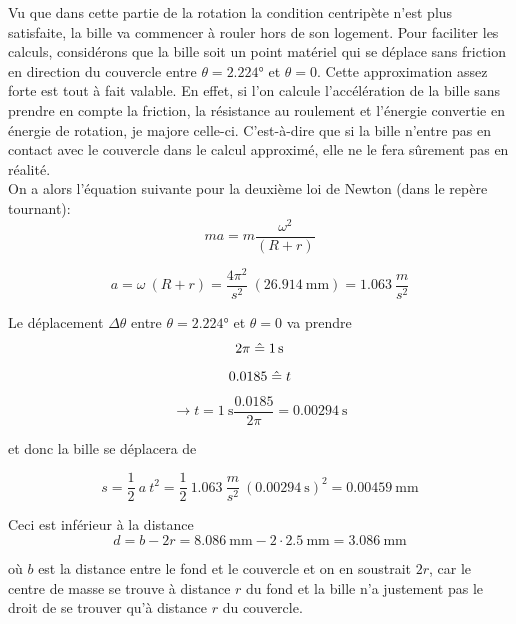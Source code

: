 Vu que dans cette partie de la rotation la condition centripète n'est plus satisfaite, la bille va commencer à rouler hors de son logement. Pour faciliter les calculs, considérons que la bille soit un point matériel qui se déplace sans friction en direction du couvercle entre $\theta = \ang{2.224}$ et $\theta = 0$. 
Cette approximation assez forte est tout à fait valable. En effet, si l'on calcule l'accélération de la bille sans prendre en compte la friction, la résistance au roulement et l'énergie convertie en énergie de rotation, je majore celle-ci. C'est-à-dire que si la bille n'entre pas en contact avec le couvercle dans le calcul approximé, elle ne le fera sûrement pas en réalité.\\

On a alors l'équation suivante pour la deuxième loi de Newton (dans le repère tournant):
\[ma = m \frac{\omega^{2}}{(R + r)}\]

\[a = \omega \ (R + r) = \frac{4 \pi^{2}}{s^{2}} \ (\SI{26.914}{\milli\metre}) = 1.063 \ \frac{m}{s^{2}}\]

Le déplacement $\Delta\theta$ entre $\theta =\ang{2.224}$ et $\theta = 0$ va prendre
\[2 \pi \estimates \SI{1}{\s}\]
\[0.0185 \mathrel{\hat{=}} t \]
\[\rightarrow t = \SI{1}{\s} \frac{0.0185}{2 \pi} = \SI{0.00294}{\second}\]

et donc la bille se déplacera de 

\[s = \frac{1}{2} \ a \ t^{2} = \frac{1}{2} \ 1.063 \ \frac{m}{s^{2}} \ (\SI{0.00294}{\s})^{2} = \SI{0.00459}{\milli\metre}\]

Ceci est inférieur à la distance 
\[d = b - 2r = \SI{8.086}{\milli\metre} - 2 \cdot \SI{2.5}{\milli\metre} = \SI{3.086}{\milli\metre}\]

où $b$ est la distance entre le fond et le couvercle et on en soustrait $2r$, car le centre de masse se trouve à distance $r$ du fond et la bille n'a justement pas le droit de se trouver qu'à distance $r$ du couvercle.

